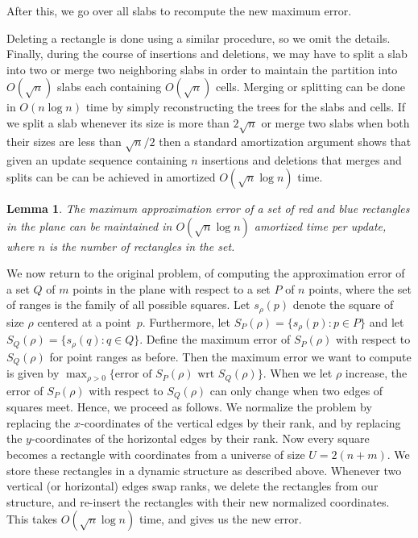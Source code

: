 \documentclass{elsart}
\newtheorem{lemma}[definition]{Lemma}
\begin{document}
After this, we go over all slabs to recompute the new maximum error.

Deleting a rectangle is done using a similar procedure, so we omit the
details.  Finally, during the course of insertions and deletions, we
may have to split a slab into two or merge two neighboring slabs in
order to maintain the partition into $O(\sqrt{n})$ slabs each
containing $O(\sqrt{n})$ cells. Merging or splitting can be done in
$O(n \log n)$ time by simply reconstructing the trees for the slabs
and cells.  If we split a slab whenever its size is more than
$2\sqrt{n}$ or merge two slabs when both their sizes are less than
$\sqrt{n}/2$ then a standard amortization argument shows that given an
update sequence containing $n$ insertions and deletions that merges
and splits can be can be achieved in amortized $O(\sqrt{n}\log n)$
time.
\begin{lemma}\label{le:2d_dynamic}
The maximum approximation error of a set of red and blue rectangles in
the plane can be maintained in $O(\sqrt{n}\log n )$ amortized time per
update, where $n$ is the number of rectangles in the set.
\end{lemma}
We now return to the original problem, of computing the approximation
error of a set $Q$ of $m$ points in the plane with respect to a set
$P$ of $n$ points, where the set of ranges is the family of all
possible squares. Let $s_{\rho}(p)$ denote the square of size $\rho$
centered at a point~$p$.  Furthermore, let $S_P(\rho) = \{ s_{\rho}(p)
: p\in P \}$ and let $S_Q(\rho) = \{ s_{\rho}(q) : q\in Q \}$.  Define
the maximum error of $S_P(\rho)$ with respect to $S_Q(\rho)$ for point
ranges as before. Then the maximum error we want to compute is given
by $\max_{\rho>0} \{ \mbox{error of $S_P(\rho)$ wrt $S_Q(\rho)$} \}$.
When we let $\rho$ increase, the error of $S_P(\rho)$ with respect to
$S_Q(\rho)$ can only change when two edges of squares meet. Hence, we
proceed as follows.  We normalize the problem by replacing the
$x$-coordinates of the vertical edges by their rank, and by replacing
the $y$-coordinates of the horizontal edges by their rank.  Now every
square becomes a rectangle with coordinates from a universe of size
$U=2(n+m)$. We store these rectangles in a dynamic structure as
described above.  Whenever two vertical (or horizontal) edges swap
ranks, we delete the rectangles from our structure, and re-insert the
rectangles with their new normalized coordinates.  This takes
$O(\sqrt{n}\log n)$ time, and gives us the new error.
\end{document}
